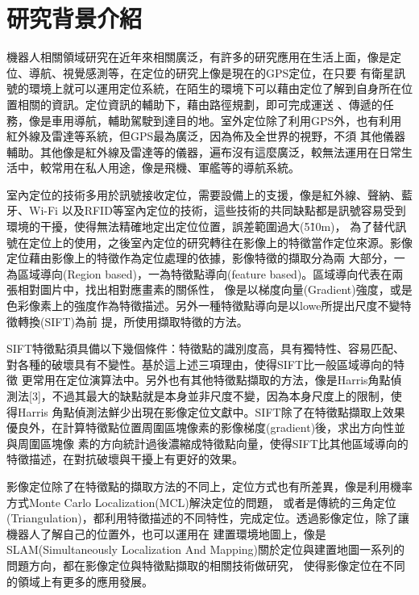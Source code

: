 \section{研究背景介紹}

	機器人相關領域研究在近年來相關廣泛，有許多的研究應用在生活上面，像是定位、導航、視覺感測等，在定位的研究上像是現在的GPS定位，在只要
有衛星訊號的環境上就可以運用定位系統，在陌生的環境下可以藉由定位了解到自身所在位置相關的資訊。定位資訊的輔助下，藉由路徑規劃，即可完成運送
、傳遞的任務，像是車用導航，輔助駕駛到達目的地。室外定位除了利用GPS外，也有利用紅外線及雷達等系統，但GPS最為廣泛，因為佈及全世界的視野，不須
其他儀器輔助。其他像是紅外線及雷達等的儀器，遍布沒有這麼廣泛，較無法運用在日常生活中，較常用在私人用途，像是飛機、軍艦等的導航系統。

	室內定位的技術多用於訊號接收定位，需要設備上的支援，像是紅外線、聲納\cite{Bekkerman2006}、藍牙、Wi-Fi\cite{Chin-HengLim2007}
以及RFID\cite{Zhou2009}等室內定位的技術，這些技術的共同缺點都是訊號容易受到環境的干擾，使得無法精確地定出定位位置，誤差範圍過大(5\~10m)，
為了替代訊號在定位上的使用，之後室內定位的研究轉往在影像上的特徵當作定位來源。影像定位藉由影像上的特徵作為定位處理的依據，影像特徵的擷取分為兩
大部分，一為區域導向(Region based)，一為特徵點導向(feature based)\cite{Zitová03}。區域導向代表在兩張相對圖片中，找出相對應畫素的關係性，
像是以梯度向量(Gradient)強度，或是色彩像素上的強度作為特徵描述。另外一種特徵點導向是以lowe\cite{Lowe2004}所提出尺度不變特徵轉換(SIFT)為前
提，所使用擷取特徵的方法。

	SIFT特徵點須具備以下幾個條件：特徵點的識別度高，具有獨特性、容易匹配、對各種的破壞具有不變性。基於這上述三項理由，使得SIFT比一般區域導向的特徵
更常用在定位演算法中。另外也有其他特徵點擷取的方法，像是Harris角點偵測法[3]，不過其最大的缺點就是本身並非尺度不變，因為本身尺度上的限制，使得Harris
角點偵測法鮮少出現在影像定位文獻中。SIFT除了在特徵點擷取上效果優良外，在計算特徵點位置周圍區塊像素的影像梯度(gradient)後，求出方向性並與周圍區塊像
素的方向統計過後濃縮成特徵點向量，使得SIFT比其他區域導向的特徵描述，在對抗破壞與干擾上有更好的效果。

	影像定位除了在特徵點的擷取方法的不同上，定位方式也有所差異，像是利用機率方式Monte Carlo Localization(MCL)解決定位的問題\cite{Thrun2001}，
或者是傳統的三角定位(Triangulation)\cite{Cobzas2003}，都利用特徵描述的不同特性，完成定位。透過影像定位，除了讓機器人了解自己的位置外，也可以運用在
建置環境地圖上，像是SLAM(Simultaneously Localization And Mapping)關於定位與建置地圖一系列的問題方向，都在影像定位與特徵點擷取的相關技術做研究，
使得影像定位在不同的領域上有更多的應用發展。
	
